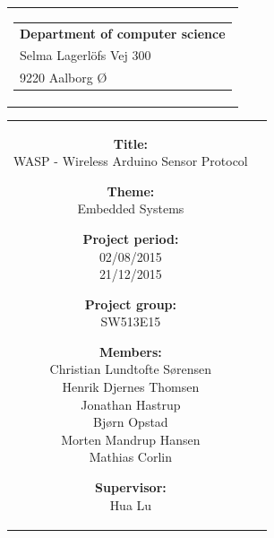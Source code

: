 
\thispagestyle{empty}

{\samepage 
\begin{tabular}{r}
	\parbox{\textwidth}{  
	\hfill \parbox{7cm}{\begin{tabular}{l} %
		{\small \textbf{Department of computer science}}\\
		{\small Selma Lagerlöfs Vej 300} \\
		{\small 9220 Aalborg Ø}
	\end{tabular}}
	}
\end{tabular}

\begin{tabular}{cc}
	\parbox{8cm}{
	\begin{description}
		\item { \textbf{Title:}}\\ 
			WASP - Wireless Arduino Sensor Protocol
    		\item { \textbf{Theme:}}\\ 
			Embedded Systems\\
	\end{description}
	
	\parbox{8cm}{
	\begin{description}
		\item { \textbf{Project period:}}\\
			02/08/2015\\
			21/12/2015\\
 		\hspace{4cm}
		\item { \textbf{Project group:}}\\
  			SW513E15\\
 		\hspace{4cm}
		\item {\textbf{Members:}}\\
            Christian Lundtofte Sørensen\\
            Henrik Djernes Thomsen\\
            Jonathan Hastrup\\
            Bjørn Opstad\\
            Morten Mandrup Hansen\\
            Mathias Corlin\\
		\hspace{2cm}
		\item { \textbf{Supervisor:}}\\
 			Hua Lu\\
  	\end{description} 
	}

}
\end{tabular}}
